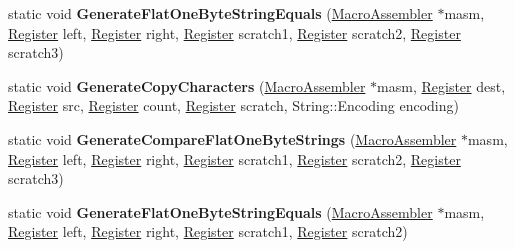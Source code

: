 \begin{DoxyCompactItemize}
\item 
static void {\bfseries Generate\+Flat\+One\+Byte\+String\+Equals} (\hyperlink{classv8_1_1internal_1_1_macro_assembler}{Macro\+Assembler} $\ast$masm, \hyperlink{structv8_1_1internal_1_1_register}{Register} left, \hyperlink{structv8_1_1internal_1_1_register}{Register} right, \hyperlink{structv8_1_1internal_1_1_register}{Register} scratch1, \hyperlink{structv8_1_1internal_1_1_register}{Register} scratch2, \hyperlink{structv8_1_1internal_1_1_register}{Register} scratch3)\hypertarget{classv8_1_1internal_1_1_string_helper_af4eb5dbd003a23d35fa965edcd1c4856}{}\label{classv8_1_1internal_1_1_string_helper_af4eb5dbd003a23d35fa965edcd1c4856}

\item 
static void {\bfseries Generate\+Copy\+Characters} (\hyperlink{classv8_1_1internal_1_1_macro_assembler}{Macro\+Assembler} $\ast$masm, \hyperlink{structv8_1_1internal_1_1_register}{Register} dest, \hyperlink{structv8_1_1internal_1_1_register}{Register} src, \hyperlink{structv8_1_1internal_1_1_register}{Register} count, \hyperlink{structv8_1_1internal_1_1_register}{Register} scratch, String\+::\+Encoding encoding)\hypertarget{classv8_1_1internal_1_1_string_helper_acd699f7bf40a599d86efca2556efde61}{}\label{classv8_1_1internal_1_1_string_helper_acd699f7bf40a599d86efca2556efde61}

\item 
static void {\bfseries Generate\+Compare\+Flat\+One\+Byte\+Strings} (\hyperlink{classv8_1_1internal_1_1_macro_assembler}{Macro\+Assembler} $\ast$masm, \hyperlink{structv8_1_1internal_1_1_register}{Register} left, \hyperlink{structv8_1_1internal_1_1_register}{Register} right, \hyperlink{structv8_1_1internal_1_1_register}{Register} scratch1, \hyperlink{structv8_1_1internal_1_1_register}{Register} scratch2, \hyperlink{structv8_1_1internal_1_1_register}{Register} scratch3)\hypertarget{classv8_1_1internal_1_1_string_helper_a7ac6a0492ad8bfd6d538d6d38be9881f}{}\label{classv8_1_1internal_1_1_string_helper_a7ac6a0492ad8bfd6d538d6d38be9881f}

\item 
static void {\bfseries Generate\+Flat\+One\+Byte\+String\+Equals} (\hyperlink{classv8_1_1internal_1_1_macro_assembler}{Macro\+Assembler} $\ast$masm, \hyperlink{structv8_1_1internal_1_1_register}{Register} left, \hyperlink{structv8_1_1internal_1_1_register}{Register} right, \hyperlink{structv8_1_1internal_1_1_register}{Register} scratch1, \hyperlink{structv8_1_1internal_1_1_register}{Register} scratch2)\hypertarget{classv8_1_1internal_1_1_string_helper_a9078f89cbc64990f11c34a5221365dc2}{}\label{classv8_1_1internal_1_1_string_helper_a9078f89cbc64990f11c34a5221365dc2}


\end{DoxyCompactItemize}
